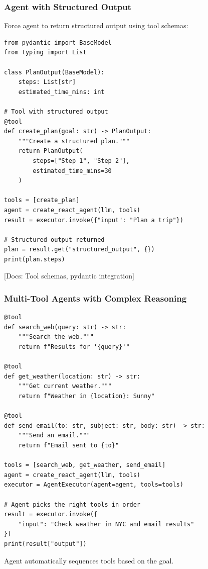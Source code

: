 \documentclass[aspectratio=169,11pt]{beamer}
\newcommand{\docref}[1]{{\scriptsize\color{docgray}[Docs: #1]}}
\begin{document}
\begin{frame}[fragile]
\frametitle{Agent with Structured Output}

Force agent to return structured output using tool schemas:

\vspace{0.3cm}

\begin{lstlisting}
from pydantic import BaseModel
from typing import List

class PlanOutput(BaseModel):
    steps: List[str]
    estimated_time_mins: int

# Tool with structured output
@tool
def create_plan(goal: str) -> PlanOutput:
    """Create a structured plan."""
    return PlanOutput(
        steps=["Step 1", "Step 2"],
        estimated_time_mins=30
    )

tools = [create_plan]
agent = create_react_agent(llm, tools)
result = executor.invoke({"input": "Plan a trip"})

# Structured output returned
plan = result.get("structured_output", {})
print(plan.steps)
\end{lstlisting}

\docref{Tool schemas, pydantic integration}

\end{frame}

\begin{frame}[fragile]
\frametitle{Multi-Tool Agents with Complex Reasoning}

\begin{lstlisting}
@tool
def search_web(query: str) -> str:
    """Search the web."""
    return f"Results for '{query}'"

@tool
def get_weather(location: str) -> str:
    """Get current weather."""
    return f"Weather in {location}: Sunny"

@tool
def send_email(to: str, subject: str, body: str) -> str:
    """Send an email."""
    return f"Email sent to {to}"

tools = [search_web, get_weather, send_email]
agent = create_react_agent(llm, tools)
executor = AgentExecutor(agent=agent, tools=tools)

# Agent picks the right tools in order
result = executor.invoke({
    "input": "Check weather in NYC and email results"
})
print(result["output"])
\end{lstlisting}

Agent automatically sequences tools based on the goal.

\end{frame}
\end{document}
